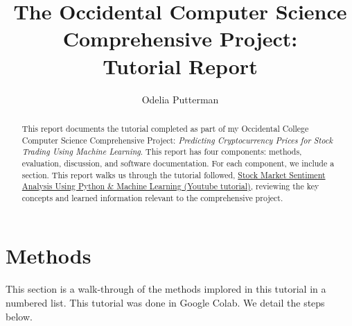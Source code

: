 \documentclass[10pt,twocolumn]{article}
\title{The Occidental Computer Science Comprehensive Project: \\ Tutorial Report}
\author{Odelia Putterman}
\affiliation{Occidental College}
\begin{document}
\maketitle

\begin{abstract}
    This report documents the tutorial completed as part of my Occidental College Computer Science Comprehensive Project: \textit{Predicting Cryptocurrency Prices for Stock Trading Using Machine Learning}. This report has four components: methods, evaluation, discussion, and software documentation. For each component, we include a section. This report walks us through the tutorial followed, \href{https://www.youtube.com/watch?v=4OlvGGAsj8I}{Stock Market Sentiment Analysis Using Python \& Machine Learning (Youtube tutorial)}, reviewing the key concepts and learned information relevant to the comprehensive project.
\end{abstract}

\section{Methods}

This section is a walk-through of the methods implored in this tutorial in a numbered list. This tutorial was done in Google Colab. We detail the steps below.
\end{document}
